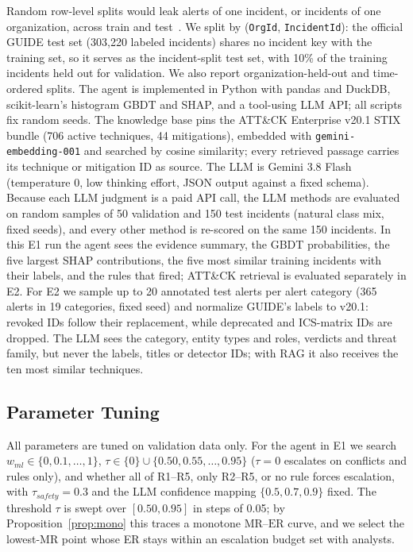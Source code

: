 \documentclass[conference]{IEEEtran}
\begin{document}
Random row-level splits would leak alerts of one incident, or incidents
of one organization, across train and test~\cite{arp2022}. We split by
(\texttt{OrgId}, \texttt{IncidentId}): the official GUIDE test set
(303{,}220 labeled incidents) shares no incident key with the training
set, so it serves as the incident-split test set, with 10\% of the
training incidents held out for validation. We also report
organization-held-out and time-ordered splits. The agent is implemented
in Python with pandas and DuckDB, scikit-learn's histogram GBDT and SHAP,
and a tool-using LLM API; all scripts fix random seeds. The knowledge
base pins the ATT\&CK Enterprise v20.1 STIX bundle (706 active
techniques, 44 mitigations), embedded with \texttt{gemini-embedding-001}
and searched by cosine similarity; every retrieved passage carries its
technique or mitigation ID as source. The LLM is Gemini 3.8 Flash
(temperature 0, low thinking effort, JSON output against a fixed
schema). Because each LLM judgment is a paid API call, the LLM methods
are evaluated on random samples of 50 validation and 150 test
incidents (natural class mix, fixed seeds), and every other method is
re-scored on the same 150 incidents. In this E1 run the agent sees the
evidence summary, the GBDT probabilities, the five largest SHAP
contributions, the five most similar training incidents with their
labels, and the rules that fired; ATT\&CK retrieval is evaluated
separately in E2. For E2 we sample up to 20 annotated test alerts per
alert category (365 alerts in 19 categories, fixed seed) and normalize
GUIDE's labels to v20.1: revoked IDs follow their replacement, while
deprecated and ICS-matrix IDs are dropped. The LLM sees the category,
entity types and roles, verdicts and threat family, but never the
labels, titles or detector IDs; with RAG it also receives the ten most
similar techniques.

\subsection{Parameter Tuning}
All parameters are tuned on validation data only. For the agent in
E1 we search $w_{ml}\in\{0,0.1,\dots,1\}$, $\tau\in\{0\}\cup\{0.50,0.55,\dots,0.95\}$
($\tau=0$ escalates on conflicts and rules only), and whether all of
R1--R5, only R2--R5, or no rule forces escalation, with
$\tau_{safety}=0.3$ and the LLM confidence mapping
$\{0.5,0.7,0.9\}$ fixed. The threshold
$\tau$ is swept over $[0.50,0.95]$ in steps of 0.05; by
Proposition~\ref{prop:mono} this traces a monotone
$\mathrm{MR}$--$\mathrm{ER}$ curve, and we select the lowest-MR point
whose ER stays within an escalation budget set with analysts.
\end{document}
